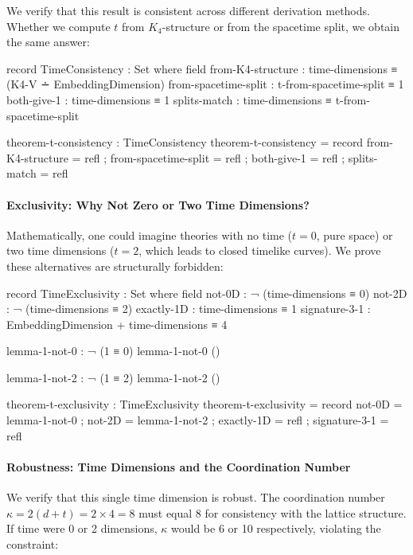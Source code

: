 \documentclass[11pt,a4paper]{book}
\begin{document}
We verify that this result is consistent across different derivation methods. Whether we 
compute $t$ from $K_4$-structure or from the spacetime split, we obtain the same answer:

\begin{code}
record TimeConsistency : Set where
  field
    from-K4-structure     : time-dimensions ≡ (K4-V ∸ EmbeddingDimension)
    from-spacetime-split  : t-from-spacetime-split ≡ 1
    both-give-1           : time-dimensions ≡ 1
    splits-match          : time-dimensions ≡ t-from-spacetime-split

theorem-t-consistency : TimeConsistency
theorem-t-consistency = record
  { from-K4-structure    = refl
  ; from-spacetime-split = refl
  ; both-give-1          = refl
  ; splits-match         = refl
  }
\end{code}

\paragraph{Exclusivity: Why Not Zero or Two Time Dimensions?}

Mathematically, one could imagine theories with no time ($t = 0$, pure space) or two time 
dimensions ($t = 2$, which leads to closed timelike curves). We prove these alternatives 
are structurally forbidden:

\begin{code}
record TimeExclusivity : Set where
  field
    not-0D         : ¬ (time-dimensions ≡ 0)
    not-2D         : ¬ (time-dimensions ≡ 2)
    exactly-1D     : time-dimensions ≡ 1
    signature-3-1  : EmbeddingDimension + time-dimensions ≡ 4

lemma-1-not-0 : ¬ (1 ≡ 0)
lemma-1-not-0 ()

lemma-1-not-2 : ¬ (1 ≡ 2)
lemma-1-not-2 ()

theorem-t-exclusivity : TimeExclusivity
theorem-t-exclusivity = record
  { not-0D         = lemma-1-not-0
  ; not-2D         = lemma-1-not-2
  ; exactly-1D     = refl
  ; signature-3-1  = refl
  }

\end{code}

\paragraph{Robustness: Time Dimensions and the Coordination Number}

We verify that this single time dimension is robust. The coordination number 
$\kappa = 2(d + t) = 2 \times 4 = 8$ must equal 8 for consistency with the lattice structure. 
If time were 0 or 2 dimensions, $\kappa$ would be 6 or 10 respectively, violating the constraint:
\end{document}
